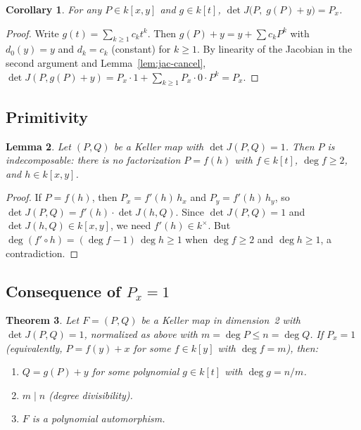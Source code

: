 \documentclass[12pt,a4paper]{article}
\newtheorem{theorem}{Theorem}[section]
\newtheorem{lemma}[theorem]{Lemma}
\newtheorem{corollary}[theorem]{Corollary}
\theoremstyle{definition}
\newcommand{\kk}{k}
\begin{document}
\begin{corollary}\label{lem:key-identity}
For any $P \in \kk[x,y]$ and $g \in \kk[t]$,
$\det J\bigl(P,\; g(P) + y\bigr) = P_x$.
\end{corollary}

\begin{proof}
Write $g(t) = \sum_{k \geq 1} c_k t^k$. Then $g(P) + y = y + \sum c_k P^k$
with $d_0(y) = y$ and $d_k = c_k$ (constant) for $k \geq 1$.
By linearity of the Jacobian in the second argument and
Lemma~\ref{lem:jac-cancel},
$\det J(P, g(P)+y) = P_x \cdot 1 + \sum_{k \geq 1} P_x \cdot 0 \cdot P^k = P_x$.
\end{proof}

\subsection{Primitivity}

\begin{lemma}\label{lem:primitive}
Let $(P,Q)$ be a Keller map with $\det J(P,Q) = 1$. Then $P$ is indecomposable:
there is no factorization $P = f(h)$ with $f \in \kk[t]$, $\deg f \geq 2$,
and $h \in \kk[x,y]$.
\end{lemma}

\begin{proof}
If $P = f(h)$, then $P_x = f'(h)\,h_x$ and $P_y = f'(h)\,h_y$, so
$\det J(P,Q) = f'(h) \cdot \det J(h,Q)$.
Since $\det J(P,Q) = 1$ and $\det J(h,Q) \in \kk[x,y]$, we need
$f'(h) \in \kk^\times$.
But $\deg(f' \circ h) = (\deg f - 1)\,\deg h \geq 1$ when
$\deg f \geq 2$ and $\deg h \geq 1$, a contradiction.
\end{proof}

\subsection{Consequence of \texorpdfstring{$P_x = 1$}{Px = 1}}

\begin{theorem}\label{thm:px-implies-div}
Let $F = (P,Q)$ be a Keller map in dimension~2 with $\det J(P,Q) = 1$,
normalized as above with $m = \deg P \leq n = \deg Q$.
If $P_x = 1$ (equivalently, $P = f(y) + x$ for some $f \in \kk[y]$ with $\deg f = m$),
then:
\begin{enumerate}
\item $Q = g(P) + y$ for some polynomial $g \in \kk[t]$ with $\deg g = n/m$.
\item $m \mid n$ (degree divisibility).
\item $F$ is a polynomial automorphism.
\end{enumerate}
\end{theorem}
\end{document}
